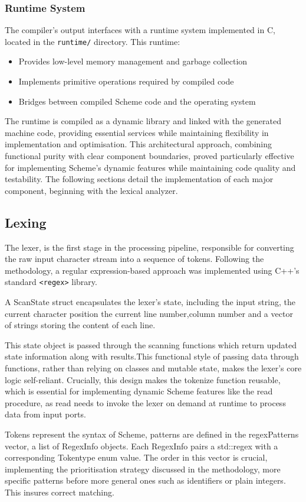 \documentclass[final]{cmpreport_02}
\begin{document}
\subsubsection{Runtime System}
The compiler's output interfaces with a runtime system implemented in C, located in the \texttt{runtime/} directory. This runtime:
\begin{itemize}
\item Provides low-level memory management and garbage collection
\item Implements primitive operations required by compiled code
\item Bridges between compiled Scheme code and the operating system
\end{itemize}
The runtime is compiled as a dynamic library and linked with the generated machine code, providing essential services while maintaining flexibility in implementation and optimisation.
This architectural approach, combining functional purity with clear component boundaries, proved particularly effective for implementing Scheme's dynamic features while maintaining code quality and testability. The following sections detail the implementation of each major component, beginning with the lexical analyzer.


\subsection{Lexing}
The lexer, is the first stage in the processing pipeline, responsible for converting the raw input character stream into a sequence of tokens. Following the methodology, a regular expression-based approach was implemented using C++'s standard \texttt{<regex>} library.

A ScanState struct encapsulates the lexer's state, including the input string, the current character position the current line number,column number and a vector of strings storing the content of each line. 

This state object is passed through the scanning functions which return updated state information along with results.This functional style of passing data through functions, rather than relying on classes and mutable state, makes the lexer's core logic self-reliant. Crucially, this design makes the tokenize function reusable, which is essential for implementing dynamic Scheme features like the read procedure, as read needs to invoke the lexer on demand at runtime to process data from input ports.

Tokens represent the syntax of Scheme, patterns are defined in the regexPatterns vector, a list of RegexInfo objects. Each RegexInfo pairs a std::regex with a corresponding Tokentype enum value. The order in this vector is crucial, implementing the prioritisation strategy discussed in the methodology, more specific patterns before more general ones such as identifiers or plain integers. This insures correct matching. 
\end{document}
